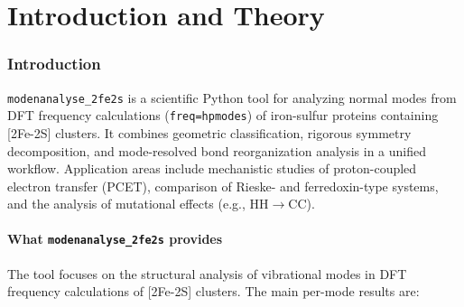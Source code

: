 \documentclass[11pt,a4paper,twoside]{article}
\theoremstyle{remark}
\begin{document}
\tableofcontents
\clearpage

\part{Introduction and Theory}

\section{Introduction}
\label{sec:einleitung}

\texttt{modenanalyse\_2fe2s} is a scientific Python tool for analyzing
normal modes from DFT frequency calculations
(\texttt{freq=hpmodes}) of iron-sulfur proteins containing
{[}2Fe-2S{]} clusters. It combines geometric classification, rigorous
symmetry decomposition, and mode-resolved bond reorganization analysis
in a unified workflow. Application areas include mechanistic studies of
proton-coupled electron transfer (PCET), comparison of
Rieske- and ferredoxin-type systems, and the analysis of mutational
effects (e.g., HH$\to$CC).

\subsection{What \texttt{modenanalyse\_2fe2s} provides}
\label{sec:scope}

The tool focuses on the structural analysis of vibrational modes in
DFT frequency calculations of [2Fe-2S] clusters. The main per-mode
results are:
\end{document}
